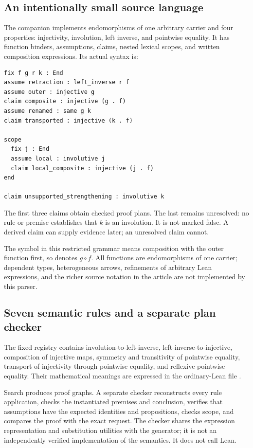 \documentclass[11pt,a4paper]{article}
\newcommand{\code}[1]{\texttt{\detokenize{#1}}}
\theoremstyle{definition}
\theoremstyle{remark}
\begin{document}
\subsection{An intentionally small source language}

The companion implements endomorphisms of one arbitrary carrier and four
properties: injectivity, involution, left inverse, and pointwise equality.
It has function binders, assumptions, claims, nested lexical scopes, and written
composition expressions. Its actual syntax is:
\begin{lstlisting}
fix f g r k : End
assume retraction : left_inverse r f
assume outer : injective g
claim composite : injective (g . f)
assume renamed : same g k
claim transported : injective (k . f)

scope
  fix j : End
  assume local : involutive j
  claim local_composite : injective (j . f)
end

claim unsupported_strengthening : involutive k
\end{lstlisting}
The first three claims obtain checked proof plans. The last remains unresolved:
no rule or premise establishes that $k$ is an involution. It is not marked
false. A derived claim can supply evidence later; an unresolved claim cannot.

The symbol \code{.} in this restricted grammar means composition with the outer
function first, so \code{(g . f)} denotes $g\circ f$. All functions are
endomorphisms of one carrier; dependent types, heterogeneous arrows, refinements
of arbitrary Lean expressions, and the richer source notation in the article
are not implemented by this parser.

\subsection{Seven semantic rules and a separate plan checker}

The fixed registry contains involution-to-left-inverse, left-inverse-to-injective,
composition of injective maps, symmetry and transitivity of pointwise equality,
transport of injectivity through pointwise equality, and reflexive pointwise
equality. Their mathematical meanings are expressed in the ordinary-Lean file
\code{CloverCore.lean}.

Search produces proof graphs. A separate checker reconstructs every rule
application, checks the instantiated premises and conclusion, verifies that
assumptions have the expected identities and propositions, checks scope, and
compares the proof with the exact request. The checker shares the expression
representation and substitution utilities with the generator; it is not an
independently verified implementation of the semantics. It does not call Lean.
\end{document}
